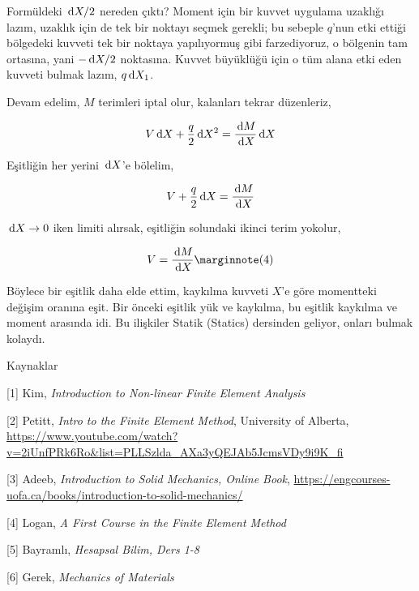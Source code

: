 \documentclass[12pt,fleqn]{article}\usepackage{../../common}
\begin{document}
Formüldeki $\,\mathrm{d} X / 2$ nereden çıktı? Moment için bir kuvvet uygulama uzaklığı
lazım, uzaklık için de tek bir noktayı seçmek gerekli; bu sebeple $q$'nun etki
ettiği bölgedeki kuvveti tek bir noktaya yapılıyormuş gibi farzediyoruz, o
bölgenin tam ortasına, yani $- \,\mathrm{d} X / 2$ noktasına.  Kuvvet büyüklüğü için o
tüm alana etki eden kuvveti bulmak lazım, $q \,\mathrm{d} X_1$.

Devam edelim, $M$ terimleri iptal olur, kalanları tekrar düzenleriz,

$$
V \,\mathrm{d} X + \frac{q}{2} \,\mathrm{d} X^2 = \frac{\,\mathrm{d} M}{\,\mathrm{d} X} \,\mathrm{d} X
$$

Eşitliğin her yerini $\,\mathrm{d} X$'e bölelim,

$$
V + \frac{q}{2} \,\mathrm{d} X = \frac{\,\mathrm{d} M}{\,\mathrm{d} X} 
$$

$\,\mathrm{d} X \to 0$ iken limiti alırsak, eşitliğin solundaki ikinci terim yokolur,

$$
V = \frac{\ud M}{\ud X}
\mlabel{4}
$$

Böylece bir eşitlik daha elde ettim, kaykılma kuvveti $X$'e göre momentteki
değişim oranına eşit. Bir önceki eşitlik yük ve kaykılma, bu eşitlik kaykılma ve
moment arasında idi. Bu ilişkiler Statik (Statics) dersinden geliyor, onları
bulmak kolaydı.

Kaynaklar

[1] Kim, {\em Introduction to Non-linear Finite Element Analysis}

[2] Petitt, {\em Intro to the Finite Element Method}, University of Alberta,
    \url{https://www.youtube.com/watch?v=2iUnfPRk6Ro&list=PLLSzlda_AXa3yQEJAb5JcmsVDy9i9K_fi}
    
[3] Adeeb, {\em Introduction to Solid Mechanics, Online Book},
    \url{https://engcourses-uofa.ca/books/introduction-to-solid-mechanics/}

[4] Logan, {\em A First Course in the Finite Element Method}

[5] Bayramlı, {\em Hesapsal Bilim, Ders 1-8}

[6] Gerek, {\em Mechanics of Materials}
\end{document}
